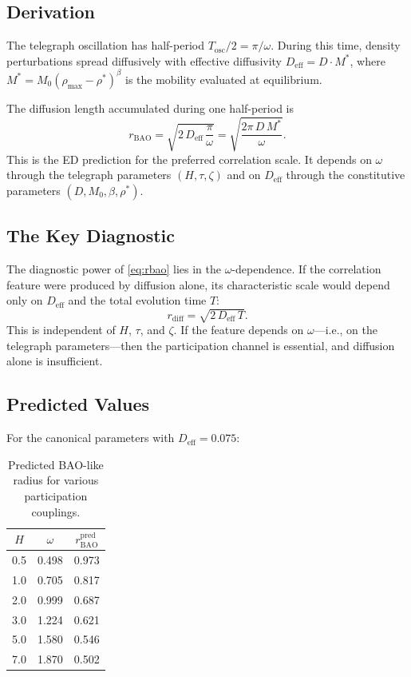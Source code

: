 \documentclass[11pt]{article}
\begin{document}
\subsection{Derivation}

The telegraph oscillation has half-period \(T_{\mathrm{osc}}/2 = \pi/\omega\). During this time, density perturbations spread diffusively with effective diffusivity \(D_{\mathrm{eff}} = D \cdot M^*\), where \(M^* = M_0(\rho_{\max} - \rho^*)^\beta\) is the mobility evaluated at equilibrium.

The diffusion length accumulated during one half-period is
\begin{equation}\label{eq:rbao}
  r_{\mathrm{BAO}} = \sqrt{2\,D_{\mathrm{eff}}\,\frac{\pi}{\omega}}
  = \sqrt{\frac{2\pi\,D\,M^*}{\omega}}.
\end{equation}
This is the ED prediction for the preferred correlation scale. It depends on \(\omega\) through the telegraph parameters \((H, \tau, \zeta)\) and on \(D_{\mathrm{eff}}\) through the constitutive parameters \((D, M_0, \beta, \rho^*)\).

\subsection{The Key Diagnostic}

The diagnostic power of \eqref{eq:rbao} lies in the \(\omega\)-dependence. If the correlation feature were produced by diffusion alone, its characteristic scale would depend only on \(D_{\mathrm{eff}}\) and the total evolution time \(T\):
\begin{equation}\label{eq:rdiff}
  r_{\mathrm{diff}} = \sqrt{2\,D_{\mathrm{eff}}\,T}.
\end{equation}
This is independent of \(H\), \(\tau\), and \(\zeta\). If the feature depends on \(\omega\)---i.e., on the telegraph parameters---then the participation channel is essential, and diffusion alone is insufficient.

\subsection{Predicted Values}

For the canonical parameters with \(D_{\mathrm{eff}} = 0.075\):

\begin{table}[h]
\centering
\begin{tabular}{@{}ccc@{}}
\toprule
\(H\) & \(\omega\) & \(r_{\mathrm{BAO}}^{\mathrm{pred}}\) \\
\midrule
0.5 & 0.498 & 0.973 \\
1.0 & 0.705 & 0.817 \\
2.0 & 0.999 & 0.687 \\
3.0 & 1.224 & 0.621 \\
5.0 & 1.580 & 0.546 \\
7.0 & 1.870 & 0.502 \\
\bottomrule
\end{tabular}
\caption{Predicted BAO-like radius for various participation couplings.}
\label{tab:predicted}
\end{table}
\end{document}
